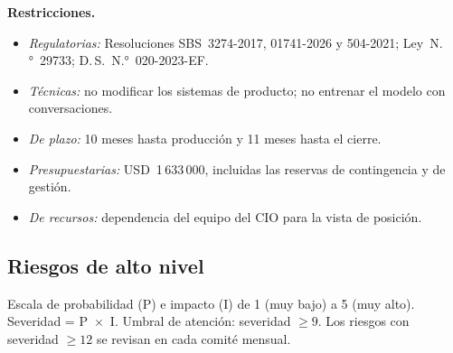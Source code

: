\documentclass[11pt,a4paper]{article}
\newcommand{\usd}[1]{USD~#1}
\begin{document}
\textbf{Restricciones.}

\begin{itemize}
  \item \textit{Regulatorias:} Resoluciones SBS~3274-2017, 01741-2026 y 504-2021; Ley~N.°~29733; D.\,S.~N.°~020-2023-EF.
  \item \textit{Técnicas:} no modificar los sistemas de producto; no entrenar el modelo con conversaciones.
  \item \textit{De plazo:} 10 meses hasta producción y 11 meses hasta el cierre.
  \item \textit{Presupuestarias:} \usd{1\,633\,000}, incluidas las reservas de contingencia y de gestión.
  \item \textit{De recursos:} dependencia del equipo del CIO para la vista de posición.
\end{itemize}

\subsection{Riesgos de alto nivel}

Escala de probabilidad (P) e impacto (I) de 1 (muy bajo) a 5 (muy alto). Severidad = P~$\times$~I. Umbral de atención: severidad $\geq 9$. Los riesgos con severidad $\geq 12$ se revisan en cada comité mensual.
\end{document}
